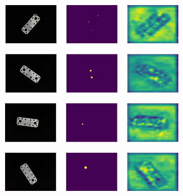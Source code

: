 \begin{figure}[htbp]
    \captionsetup[subfigure]{justification=centering}
    \centering
    \begin{subfigure}[b]{0.3\textwidth}
        \centering
        \includegraphics[width=\textwidth]{figures/ensembleimagesFC/image_prediction_100.png}

    \end{subfigure}
    \begin{subfigure}[b]{0.3\textwidth}
        \centering
        \includegraphics[width=\textwidth]{figures/ensembleimagesFC/image_prediction_036.png}


    \end{subfigure}
    \begin{subfigure}[b]{0.3\textwidth}
        \centering
        \includegraphics[width=\textwidth]{figures/ensembleimagesFC/image_prediction_052.png}


    \end{subfigure}
    \begin{subfigure}[b]{0.3\textwidth}
        \centering
        \includegraphics[width=\textwidth]{figures/ensembleimagesFC/image_prediction_061.png}


\end{subfigure}
\end{figure}
